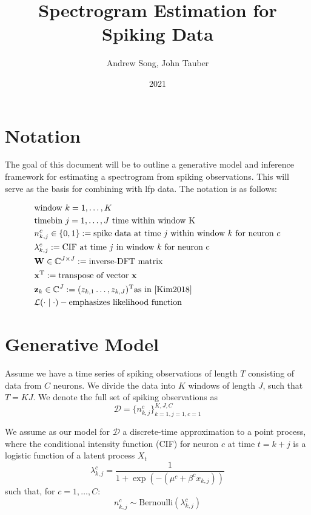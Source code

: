 \documentclass{article}
\title{Spectrogram Estimation for Spiking Data}
\author{Andrew Song, John Tauber}
\date{2021}
\newcommand{\W}{\mathbf{W}}
\newcommand{\data}{\mathcal{D}}
\def\*#1{\mathbf{#1}}
\begin{document}
\maketitle

\section{Notation}
The goal of this document will be to outline a generative model and inference
framework for estimating a spectrogram from spiking observations. This will
serve as the basis for combining with lfp data. The notation is as follows:

\begin{align*}
   &\text{window } k = 1, \ldots, K \\
   &\text{timebin } j = 1, \ldots, J \text{ time within window K} \\
   &n^c_{k,j} \in \{0,1\} := \text{spike data at time $j$ within window $k$ for neuron $c$} \\
   &\lambda^c_{k,j} := \text{CIF at time $j$ in window $k$ for neuron c} \\
   &\W \in \mathbb{C}^{J \times J} := \text{inverse-DFT matrix} \\
   &\*x^{\text{T}} := \text{transpose of vector } \*x \\
   &\*z_k\in\mathbb{C}^J := (z_{k,1} \ldots, z_{k,J} )^{\text{T}} 
      \text{as in \cite{Kim2018}}\\
   &\mathcal{L}(\cdot \mid \cdot) - \text{emphasizes likelihood function}
\end{align*}

\section{Generative Model}
Assume we have a time series of spiking observations of length $T$ consisting of
data from $C$ neurons. We divide the data into $K$ windows of length $J$, such
that $T = KJ$.  We denote the full set of
spiking observations as 
\begin{equation*}
   \data = \{n^c_{k,j}\}_{k=1, j=1, c=1}^{K,J,C}
\end{equation*}

We assume as our model for $\data$ a discrete-time approximation to a
point process, where the conditional intensity function (CIF) for neuron $c$ at time $t = k+j$
is a logistic function of a latent process $X_t$
\begin{equation}
   \lambda^c_{k,j} = \frac{1}{1 + \exp(-(\mu^c + \beta^c x_{k,j}))}
\end{equation}
such that, for $c = 1, \ldots, C$: 
\begin{equation}
   n^c_{k,j} \sim \text{Bernoulli}(\lambda^c_{k,j})
\end{equation}
\end{document}

